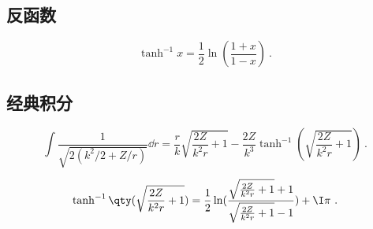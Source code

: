 \subsection{反函数}

\begin{equation}
\tanh^{-1} x = \frac12 \ln(\frac{1+x}{1-x})~.
\end{equation}

\subsection{经典积分}
\begin{equation}
\int \frac{1}{\sqrt{2(k^2/2+Z/r)}} \dd{r} = \frac{r}{k}\sqrt{\frac{2 Z}{k^2 r}+1}-\frac{2 Z}{k^3}\tanh ^{-1}(\sqrt{\frac{2 Z}{k^2 r}+1})~.
\end{equation}

\begin{equation}
\tanh ^{-1}\qty(\sqrt{\frac{2 Z}{k^2 r}+1}) = \frac12 \ln(\frac{\sqrt{\frac{2 Z}{k^2 r}+1}+1}{\sqrt{\frac{2 Z}{k^2 r}+1}-1})+\I \pi~.
\end{equation}
